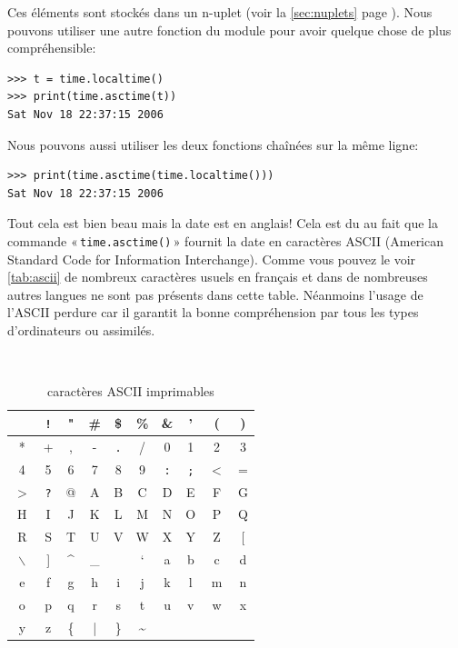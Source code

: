 Ces éléments sont stockés dans un n-uplet (voir la \autoref{sec:nuplets} page \pageref{sec:nuplets}). Nous pouvons utiliser une autre fonction du module pour avoir quelque chose de plus compréhensible:

\begin{Verbatim}[frame=single,rulecolor=\color{mbleu}, label=à taper]
>>> t = time.localtime()
>>> print(time.asctime(t))
Sat Nov 18 22:37:15 2006
\end{Verbatim}

Nous pouvons aussi utiliser les deux fonctions chaînées sur la même ligne:

\begin{Verbatim}[frame=single,rulecolor=\color{mbleu}, label=à taper]
>>> print(time.asctime(time.localtime()))
Sat Nov 18 22:37:15 2006
\end{Verbatim}

Tout cela est bien beau mais la date est en anglais! Cela est du au fait que la commande « \texttt{time.asctime()} » fournit la date en caractères ASCII (American Standard Code for Information Interchange). Comme vous pouvez le voir \autoref{tab:ascii} de nombreux caractères usuels en français et dans de nombreuses autres langues ne sont pas présents dans cette table. Néanmoins l'usage de l'ASCII perdure car il garantit la bonne compréhension par tous les types d'ordinateurs ou assimilés.

\begin{table}[h!]
\tt
\centering
\begin{tabular}{|c|c|c|c|c|c|c|c|c|c|}
\hline 
\verb*+ + & \verb+!+ & " & \# & \$ & \% & \& & ' & ( & ) \\ 
\hline
* & + & , & - & \verb+.+ & / & 0 & 1 & 2 & 3 \\ 
\hline
4 & 5 & 6 & 7 & 8 & 9 & \verb+:+ & \verb+;+ & $<$ & = \\ 
\hline
$>$ & \verb+?+ & @ & A & B & C & D & E & F & G \\ 
\hline
H & I & J & K & L & M & N & O & P & Q \\ 
\hline
R & S & T & U & V & W & X & Y & Z & [ \\ 
\hline
$\backslash$ & ] & \textasciicircum & \_ &  & ` & a & b & c & d \\ 
\hline
e & f & g & h & i & j & k & l & m & n \\ 
\hline
o & p & q & r & s & t & u & v & w & x \\ 
\hline
y & z & \{ & | & \} & \textasciitilde &  &  &  &  \\ 
\hline
\end{tabular}
\rm
\caption{caractères ASCII imprimables} \label{tab:ascii}
\end{table}

